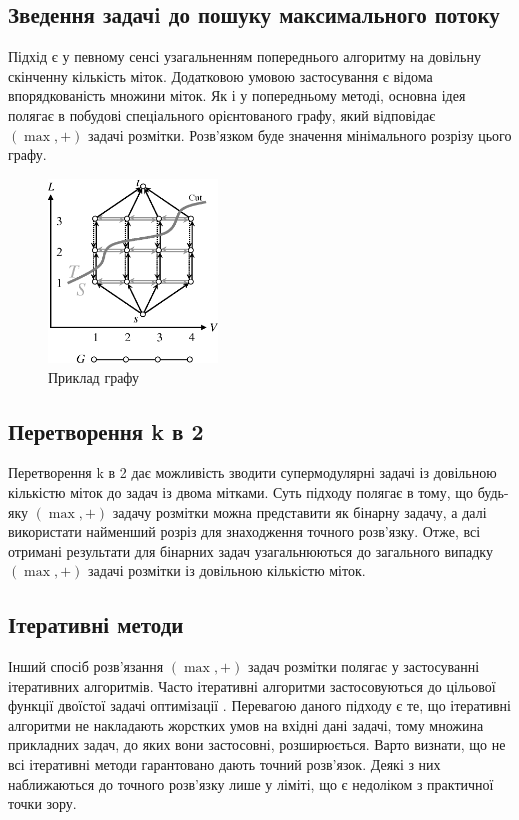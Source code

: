 \subsection{Зведення задачi до пошуку максимального потоку}

Підхід \cite{ishikawa} є у певному сенсі узагальненням попереднього алгоритму на довільну
скінченну кількість міток. Додатковою умовою застосування є відома впорядкованість
множини міток. Як і у попередньому методі, основна ідея  полягає в побудові
спеціального орієнтованого графу, який відповідає \((\max,+)\) задачі розмітки.
Розв'язком буде значення мінімального розрізу цього графу.

\begin{figure}[h]
  \centering
  \includegraphics[width=0.4\textwidth]{images/ishikawa_graph.png}
  \caption{Приклад графу \cite{ishikawa}}
  \label{fig:graph_example}
\end{figure}


\subsection{Перетворення k в 2}

Перетворення k в 2 \cite{k22} дає можливість зводити супермодулярні задачі із
довільною кількістю міток до задач із двома мітками.
Суть підходу полягає в тому, що будь-яку \((\max,+)\) задачу розмітки можна
представити як бінарну задачу, а далі використати найменший розріз для знаходження
точного розв'язку. Отже, всі отримані результати для бінарних задач
узагальнюються до загального випадку \((\max,+)\) задачі розмітки із довільною
кількістю міток.

\subsection{Ітеративні методи}

Інший спосіб розв'язання \((\max,+)\) задач розмітки полягає у застосуванні
ітеративних алгоритмів. Часто ітеративні алгоритми застосовуються до цільової функції
двоїстої задачі оптимізації \cite{SchlGig_1_usim2007,diffusion_shlezinger}. Перевагою даного підходу є те, що ітеративні алгоритми
не накладають жорстких умов на вхідні дані задачі, тому
множина прикладних задач, до яких вони застосовні, розширюється.
Варто визнати, що не всі ітеративні
методи гарантовано дають точний розв'язок.
Деякі з них наближаються до точного розв'язку лише у ліміті,
що є недоліком з практичної точки зору.


